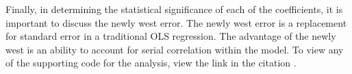 Finally, in determining the statistical significance of each of the coefficients, it is important to discuss the newly west error. The newly west error is a replacement for standard error in a traditional OLS regression. The advantage of the newly west is an ability to account for serial correlation within the model. To view any of the supporting code for the analysis, view the link in the citation \cite{Matt_code}.

